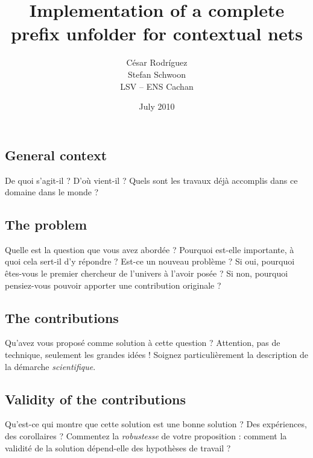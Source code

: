 \documentclass[11pt,a4paper]{article}
\begin{document}

\title{Implementation of a complete prefix unfolder for contextual nets}

\author{César Rodríguez\\Stefan Schwoon\\LSV -- ENS Cachan}
\date{July 2010}

\maketitle
\pagestyle{empty} %
\thispagestyle{empty}


\subsection*{General context}

De quoi s'agit-il ? 
D'où vient-il ? 
Quels sont les travaux déjà accomplis dans ce domaine dans le monde ?

\subsection*{The problem}

Quelle est la question que vous avez abordée ? 
Pourquoi est-elle importante, à quoi cela sert-il d'y répondre ?  
Est-ce un nouveau problème ?
Si oui, pourquoi êtes-vous le premier chercheur de l'univers à l'avoir posée ?
Si non, pourquoi pensiez-vous pouvoir apporter une contribution originale ?

\subsection*{The contributions}

Qu'avez vous proposé comme solution à cette question ? 
Attention, pas de technique, seulement les grandes idées ! 
Soignez particulièrement la description de la démarche \emph{scientifique}.

\subsection*{Validity of the contributions}

Qu'est-ce qui montre que cette solution est une bonne solution ?
Des expériences, des corollaires ? 
Commentez la \emph{robustesse} de votre proposition : 
comment la validité de la solution dépend-elle des hypothèses de travail ?
\end{document}

